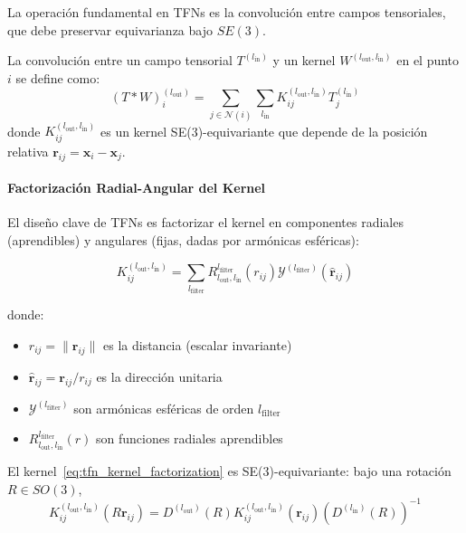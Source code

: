 La operación fundamental en TFNs es la convolución entre campos tensoriales, que debe preservar equivarianza bajo $SE(3)$.

\begin{definition}\label{def:tfn_convolution}
La convolución entre un campo tensorial $T^{(l_{\text{in}})}$ y un kernel $W^{(l_{\text{out}}, l_{\text{in}})}$ en el punto $i$ se define como:
\begin{equation}\label{eq:tfn_conv}
(T * W)_i^{(l_{\text{out}})} = \sum_{j \in \mathcal{N}(i)} \sum_{l_{\text{in}}} K_{ij}^{(l_{\text{out}}, l_{\text{in}})} T_j^{(l_{\text{in}})}
\end{equation}
donde $K_{ij}^{(l_{\text{out}}, l_{\text{in}})}$ es un kernel SE(3)-equivariante que depende de la posición relativa $\mathbf{r}_{ij} = \mathbf{x}_i - \mathbf{x}_j$.
\end{definition}

\paragraph{Factorización Radial-Angular del Kernel}

El diseño clave de TFNs es factorizar el kernel en componentes radiales (aprendibles) y angulares (fijas, dadas por armónicas esféricas):

\begin{equation}\label{eq:tfn_kernel_factorization}
K_{ij}^{(l_{\text{out}}, l_{\text{in}})} = \sum_{l_{\text{filter}}} R^{l_{\text{filter}}}_{l_{\text{out}}, l_{\text{in}}}(r_{ij}) \mathcal{Y}^{(l_{\text{filter}})}(\hat{\mathbf{r}}_{ij})
\end{equation}

donde:
\begin{itemize}
    \item $r_{ij} = \|\mathbf{r}_{ij}\|$ es la distancia (escalar invariante)
    \item $\hat{\mathbf{r}}_{ij} = \mathbf{r}_{ij} / r_{ij}$ es la dirección unitaria
    \item $\mathcal{Y}^{(l_{\text{filter}})}$ son armónicas esféricas de orden $l_{\text{filter}}$
    \item $R^{l_{\text{filter}}}_{l_{\text{out}}, l_{\text{in}}}(r)$ son funciones radiales aprendibles
\end{itemize}

\begin{proposition}\label{prop:tfn_kernel_equivariance}
El kernel~\eqref{eq:tfn_kernel_factorization} es SE(3)-equivariante: bajo una rotación $R \in SO(3)$,
\begin{equation}
K_{ij}^{(l_{\text{out}}, l_{\text{in}})}(R\mathbf{r}_{ij}) = D^{(l_{\text{out}})}(R) K_{ij}^{(l_{\text{out}}, l_{\text{in}})}(\mathbf{r}_{ij}) (D^{(l_{\text{in}})}(R))^{-1}
\end{equation}
\end{proposition}

